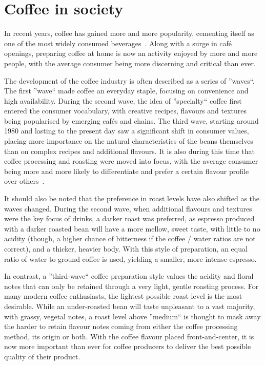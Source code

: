 \section{Coffee in society}
\label{sec:coffee-in-society} In recent years, coffee has gained more and more popularity,
cementing itself as one of the most widely consumed beverages~\cite{coffeeConsumptionStats}.
Along with a surge
in café openings, preparing coffee at home is now an activity enjoyed by more
and more people, with the average consumer being more discerning and critical than
ever.

The development of the coffee industry is often described as a series of ''waves``.
The first ''wave`` made coffee an everyday staple, focusing on convenience and high
availability.
During the second wave, the idea of ''specialty`` coffee first entered
the consumer vocabulary, with creative recipes, flavours and textures being popularised
by emerging cafés and chains.
The third wave, starting around 1980 and lasting to
the present day saw a significant shift in consumer values, placing more importance on the natural characteristics
of the beans themselves than on complex recipes and additional flavours.
It is also during this time that coffee
processing and roasting were moved into focus, with the average consumer being more
and more likely to differentiate and prefer a certain flavour profile over others~\cite{coffeeWaves}.

It should also be noted that the preference in roast levels have also shifted as
the waves changed.
During the second wave, when additional flavours and textures
were the key focus of drinks, a darker roast was preferred, as espresso produced
with a darker roasted bean will have a more mellow, sweet taste, with little to no
acidity (though, a higher chance of bitterness if the coffee / water ratios are not
correct), and a thicker, heavier body.
With this style of preparation, an equal
ratio of water to ground coffee is used, yielding a smaller, more intense
espresso.

In contrast, a ''third-wave`` coffee preparation style values the acidity and floral
notes that can only be retained through a very light, gentle roasting process.
For
many modern coffee enthusiasts, the lightest possible roast level is the most
desirable.
While an under-roasted bean will taste unpleasant to a vast majority,
with grassy, vegetal notes, a roast level above ''medium`` is thought to mask
away the harder to retain flavour notes coming from either the coffee processing
method, its origin or both.
With the coffee flavour
placed front-and-center, it is now more important than ever for coffee producers
to deliver the best possible quality of their product.

